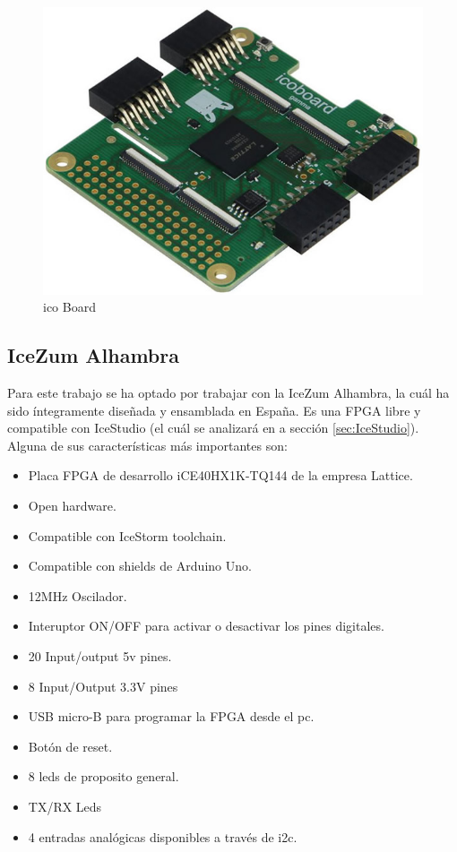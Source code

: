 \begin{center}
	\begin{figure}[H]
		\center
		\includegraphics[trim = 0mm 0mm 0mm 0mm, clip,scale=0.4]{imagenes/EstadoArte/ico_board.jpg}
		\caption{ico Board}
		\label{fig:icoBoard}
	\end{figure}
\end{center}
\subsection{IceZum Alhambra}
Para este trabajo se ha optado por trabajar con la IceZum Alhambra, la cuál ha sido íntegramente diseñada y ensamblada en España.\newline
Es una FPGA libre y compatible con IceStudio (el cuál se analizará en a sección \ref{sec:IceStudio}). Alguna de sus características más importantes son:
\begin{itemize}
	\item Placa FPGA de desarrollo iCE40HX1K-TQ144 de la empresa Lattice. 
	\item Open hardware.
	\item Compatible con IceStorm toolchain.
	\item Compatible con shields de Arduino Uno. 
	\item 12MHz Oscilador.
	\item Interuptor ON/OFF para activar o desactivar los pines digitales.
	\item 20 Input/output 5v pines.
	\item 8 Input/Output 3.3V pines
	\item USB micro-B para programar la FPGA desde el pc.
	\item Botón de reset.
	\item 8 leds de proposito general.
	\item TX/RX Leds
	\item 4 entradas analógicas disponibles a través de i2c.
\end{itemize}

